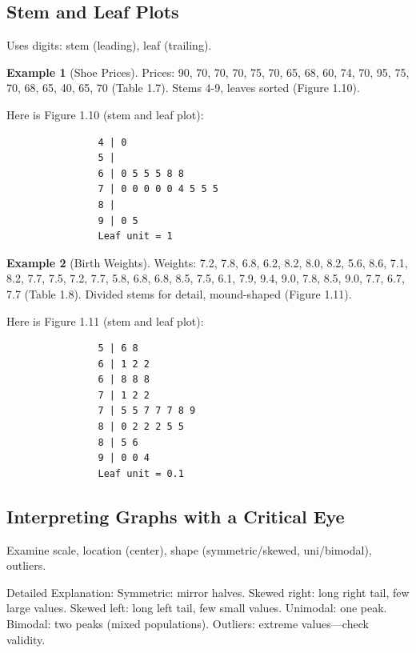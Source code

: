 \documentclass{article}
\theoremstyle{definition}
\newtheorem{example}{Example}
\begin{document}
	\subsection{Stem and Leaf Plots}
	
	Uses digits: stem (leading), leaf (trailing).
	
	\begin{example}[Shoe Prices]
		Prices: 90, 70, 70, 70, 75, 70, 65, 68, 60, 74, 70, 95, 75, 70, 68, 65, 40, 65, 70 (Table 1.7). Stems 4-9, leaves sorted (Figure 1.10).
		
		Here is Figure 1.10 (stem and leaf plot):
		
		{\small
			\begin{verbatim}
				4 | 0
				5 | 
				6 | 0 5 5 5 8 8
				7 | 0 0 0 0 0 4 5 5 5
				8 | 
				9 | 0 5
				Leaf unit = 1
			\end{verbatim}
		}
		
	\end{example}
	
	\begin{example}[Birth Weights]
		Weights: 7.2, 7.8, 6.8, 6.2, 8.2, 8.0, 8.2, 5.6, 8.6, 7.1, 8.2, 7.7, 7.5, 7.2, 7.7, 5.8, 6.8, 6.8, 8.5, 7.5, 6.1, 7.9, 9.4, 9.0, 7.8, 8.5, 9.0, 7.7, 6.7, 7.7 (Table 1.8). Divided stems for detail, mound-shaped (Figure 1.11).
		
		Here is Figure 1.11 (stem and leaf plot):
		
		{\small
			\begin{verbatim}
				5 | 6 8
				6 | 1 2 2
				6 | 8 8 8
				7 | 1 2 2
				7 | 5 5 7 7 7 8 9
				8 | 0 2 2 2 5 5
				8 | 5 6
				9 | 0 0 4
				Leaf unit = 0.1
			\end{verbatim}
		}
		
	\end{example}
	
	\subsection{Interpreting Graphs with a Critical Eye}
	
	Examine scale, location (center), shape (symmetric/skewed, uni/bimodal), outliers.
	
	Detailed Explanation: Symmetric: mirror halves. Skewed right: long right tail, few large values. Skewed left: long left tail, few small values. Unimodal: one peak. Bimodal: two peaks (mixed populations). Outliers: extreme values—check validity.
	
\end{document}
